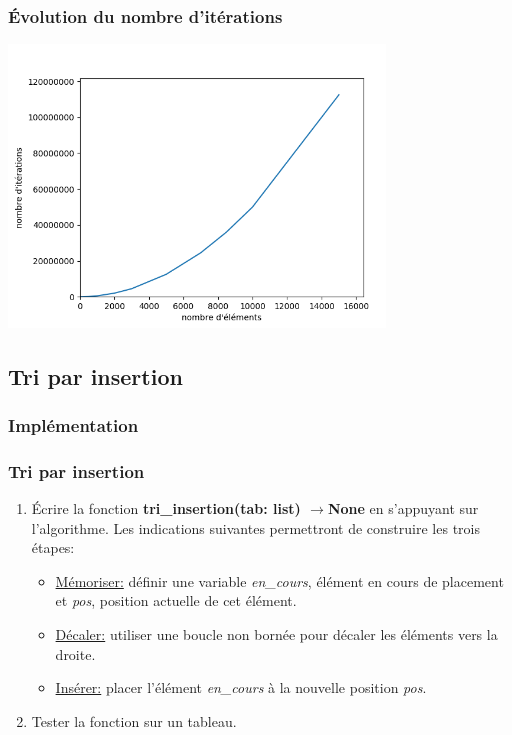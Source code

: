 \documentclass[svgnames,11pt]{beamer}
\begin{document}
\begin{frame}
    \frametitle{Évolution du nombre d'itérations}

    \begin{center}
    \centering
    \includegraphics[width=10cm]{ressources/complexite-selection.png}
    \end{center}
\end{frame}
\subsection{Tri par insertion}
\subsubsection{Implémentation}
\begin{frame}
    \frametitle{Tri par insertion}

    \begin{activite}
        \begin{enumerate}
            \item Écrire la fonction \textbf{tri\_insertion(tab: list) $\rightarrow$None} en s'appuyant sur l'algorithme. Les indications suivantes permettront de construire les trois étapes:
                  \begin{itemize}
                      \item \underline{Mémoriser:} définir une variable \emph{en\_cours}, élément en cours de placement et \emph{pos}, position actuelle de cet élément.
                      \item \underline{Décaler:} utiliser une boucle non bornée pour décaler les éléments vers la droite.
                      \item \underline{Insérer:} placer l'élément \emph{en\_cours} à la nouvelle position \emph{pos}.
                  \end{itemize}
            \item Tester la fonction sur un tableau.
        \end{enumerate}
    \end{activite}

\end{frame}
\end{document}
